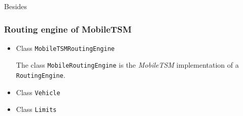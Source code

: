 Besides 


\subsubsection{Routing engine of MobileTSM}

\begin{itemize}
		
	\item Class \texttt{MobileTSMRoutingEngine}
	
		The class \texttt{MobileRoutingEngine} is the \emph{MobileTSM} implementation of a \texttt{RoutingEngine}.
		
	\item Class \texttt{Vehicle}
		
	\item Class \texttt{Limits}

\end{itemize}



